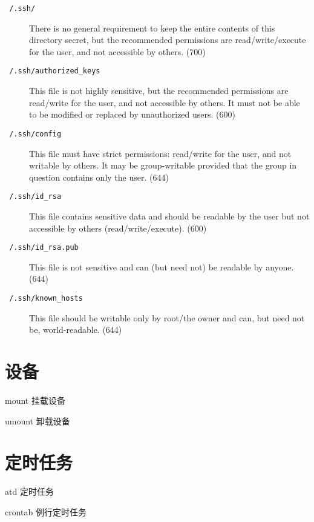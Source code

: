 \documentclass[12pt]{ctexart}
\theoremstyle{definition}
\begin{document}
    \begin{description}
        \item[\texttt{~/.ssh/}] There is no general requirement to keep the entire contents of this directory secret, but the recommended permissions are read/write/execute for the user, and not accessible by others. (700)
        \item[\texttt{~/.ssh/authorized\_keys}] This file is not highly sensitive, but the recommended permissions are read/write for the user, and not accessible by others. It must not be able to be modified or replaced by unauthorized users. (600)
        \item[\texttt{~/.ssh/config}] This file must have strict permissions: read/write for the user, and not writable by others. It may be group-writable provided that the group in question contains only the user. (644)
        \item[\texttt{~/.ssh/id\_rsa}] This file contains sensitive data and should be readable by the user but not accessible by others (read/write/execute). (600)
        \item[\texttt{~/.ssh/id\_rsa.pub}] This file is not sensitive and can (but need not) be readable by anyone. (644)
        \item[\texttt{~/.ssh/known\_hosts}] This file should be writable only by root/the owner and can, but need not be, world-readable. (644)
    \end{description}

    \section{设备}

    mount 挂载设备

    umount 卸载设备

    \section{定时任务}

    atd 定时任务

    crontab 例行定时任务
\end{document}
